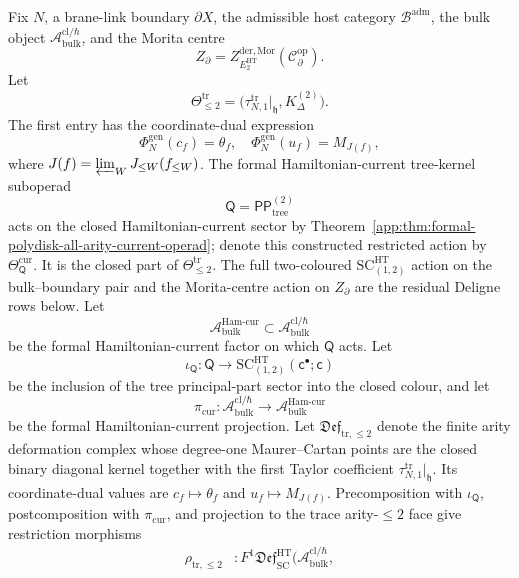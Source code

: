 \begin{defn}
\label{defn:typed-mixed-ht-deligne-equivalence-datum}
Fix \(N\), a brane-link boundary \(\partial X\), the admissible host
category \(\mathcal B^{\mathrm{adm}}\), the bulk object
\(\mathcal A^{\mathrm{cl}/\hbar}_{\mathrm{bulk}}\), and the Morita
centre
\[
  Z_\partial=
  Z^{\mathrm{der},\mathrm{Mor}}_{E_2^{\mathrm{HT}}}
  (\mathcal C^{\mathrm{op}}_\partial).
\]
Let
\[
  \Theta^{\mathrm{tr}}_{\leq 2}
  =
  \bigl(\tau_{N,1}^{\mathrm{tr}}|_{\mathfrak h},
        K^{(2)}_\Delta\bigr).
\]
The first entry has the coordinate-dual expression
\[
  \Phi_N^{\mathrm{gen}}(c_f)=\theta_f,\quad
  \Phi_N^{\mathrm{gen}}(u_f)=M_{J(f)},
\]
where \(J(f)=\varprojlim_W J_{\leq W}(f_{\leq W})\).  The formal
Hamiltonian-current tree-kernel suboperad
\[
  \mathsf Q=\mathsf{PP}^{(2)}_{\mathrm{tree}}
\]
acts on the closed Hamiltonian-current sector by
Theorem~\ref{app:thm:formal-polydisk-all-arity-current-operad}; denote
this constructed restricted action by \(\Theta_{\mathsf Q}^{\mathrm{cur}}\).
It is the closed part of \(\Theta^{\mathrm{tr}}_{\leq2}\).  The full
two-coloured \(\mathrm{SC}^{\mathrm{HT}}_{(1,2)}\) action on the
bulk--boundary pair and the Morita-centre action on \(Z_\partial\) are
the residual Deligne rows below.
Let
\[
  \mathcal A^{\mathrm{Ham\mbox{-}cur}}_{\mathrm{bulk}}
  \subset
  \mathcal A^{\mathrm{cl}/\hbar}_{\mathrm{bulk}}
\]
be the formal Hamiltonian-current factor on which \(\mathsf Q\) acts.
Let
\[
  \iota_{\mathsf Q}\colon
  \mathsf Q
  \longrightarrow
  \mathrm{SC}^{\mathrm{HT}}_{(1,2)}(\mathsf c^\bullet;\mathsf c)
\]
be the inclusion of the tree principal-part sector into the closed
colour, and let
\[
  \pi_{\mathrm{cur}}\colon
  \mathcal A^{\mathrm{cl}/\hbar}_{\mathrm{bulk}}
  \longrightarrow
  \mathcal A^{\mathrm{Ham\mbox{-}cur}}_{\mathrm{bulk}}
\]
be the formal Hamiltonian-current projection.  Let
\(\mathfrak{Def}_{\mathrm{tr},\leq2}\) denote the finite arity
deformation complex whose degree-one Maurer--Cartan points are the
closed binary diagonal kernel together with the first Taylor coefficient
\(\tau_{N,1}^{\mathrm{tr}}|_{\mathfrak h}\).  Its coordinate-dual values are
\(c_f\mapsto\theta_f\) and \(u_f\mapsto M_{J(f)}\).  Precomposition
with \(\iota_{\mathsf Q}\), postcomposition with \(\pi_{\mathrm{cur}}\),
and projection to the trace arity-\(\leq2\) face give restriction
morphisms
\[
\begin{aligned}
  \rho_{\mathrm{tr},\leq2}&\colon
  F^1\mathfrak{Def}^{\mathrm{HT}}_{\mathrm{SC}}
  (\mathcal A^{\mathrm{cl}/\hbar}_{\mathrm{bulk}},

\end{aligned}\]
\end{defn}
